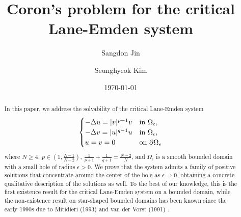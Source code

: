 \documentclass[reqno]{amsart}
\theoremstyle{remark}
\newcommand{\pa}{\partial}
\newcommand{\ep}{\epsilon}
\renewcommand{\(}{\left(}
\renewcommand{\)}{\right)}
\numberwithin{equation}{section}
\begin{document}
\title{Coron's problem for the critical Lane-Emden system}

\author[S. Jin]{Sangdon Jin}
\address[Sangdon Jin]{Department of Mathematics, Chung-Ang University, Seoul 06974, Korea}

\author[S. Kim]{Seunghyeok Kim}
\address[Seunghyeok Kim]{Department of Mathematics and Research Institute for Natural Sciences, College of Natural Sciences, Hanyang University,
222 Wangsimni-ro Seongdong-gu, Seoul 04763, Republic of Korea}

\begin{abstract}
In this paper, we address the solvability of the critical Lane-Emden system
\[\begin{cases}
-\Delta u=|v|^{p-1}v &\textup{in } \Omega_\ep,\\
-\Delta v=|u|^{q-1}u &\textup{in } \Omega_\ep,\\
u=v=0 &\textup{on } \pa \Omega_\ep
\end{cases}\]
where $N \ge 4$, $p \in (1,\frac{N-1}{N-2})$, $\frac{1}{p+1} + \frac{1}{q+1}=\frac{N-2}{N}$, and $\Omega_\ep$ is a smooth bounded domain with a small hole of radius $\ep > 0$.
We prove that the system admits a family of positive solutions that concentrate around the center of the hole as $\ep \to 0$, obtaining a concrete qualitative description of the solutions as well.
To the best of our knowledge, this is the first existence result for the critical Lane-Emden system on a bounded domain,
while the non-existence result on star-shaped bounded domains has been known since the early 1990s due to Mitidieri (1993) \cite{Mi} and van der Vorst (1991) \cite{Va}.
\end{abstract}

\date{\today}
\maketitle
\end{document}
